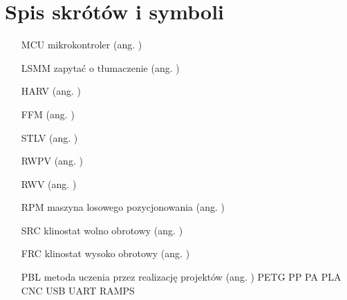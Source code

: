 \chapter*{Spis skrótów i symboli}

\begin{itemize}
	\item[MCU] mikrokontroler (ang. )
	\item[LSMM] zapytać o tłumaczenie  (ang. )
	\item[HARV]  ({ang. })
	\item[FFM]  ({ang. })
	\item[STLV]  ({ang. })
	\item[RWPV]  ({ang. })
	\item[RWV]  ({ang. })
	\item[RPM] maszyna losowego pozycjonowania ({ang. })
	\item[SRC] klinostat wolno obrotowy ({ang. })
	\item[FRC] klinostat wysoko obrotowy  ({ang. })
	\item[PBL] metoda uczenia przez realizację projektów   ({ang. })
	PETG
	PP
	PA
	PLA
	CNC
	USB
	UART
	RAMPS
\end{itemize}
